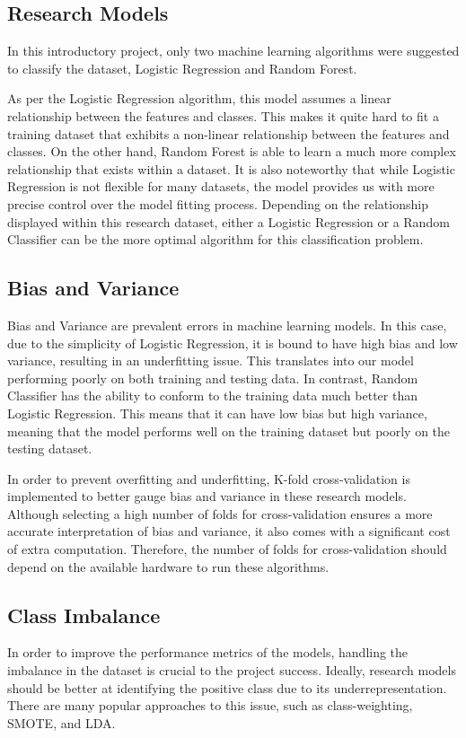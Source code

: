 \documentclass[12pt, letterpaper]{article}
\begin{document}
    \subsection{Research Models}
        In this introductory project, only two machine learning algorithms were suggested to classify the dataset, Logistic Regression and Random Forest.

        As per the Logistic Regression algorithm, this model assumes a linear relationship between the features and classes. This makes it quite hard to fit a training dataset that exhibits a non-linear relationship between the features and classes. On the other hand, Random Forest is able to learn a much more complex relationship that exists within a dataset. It is also noteworthy that while Logistic Regression is not flexible for many datasets, the model provides us with more precise control over the model fitting process. Depending on the relationship displayed within this research dataset, either a Logistic Regression or a Random Classifier can be the more optimal algorithm for this classification problem.
        
    \subsection{Bias and Variance}
        Bias and Variance are prevalent errors in machine learning models. In this case, due to the simplicity of Logistic Regression, it is bound to have high bias and low variance, resulting in an underfitting issue. This translates into our model performing poorly on both training and testing data. In contrast, Random Classifier has the ability to conform to the training data much better than Logistic Regression. This means that it can have low bias but high variance, meaning that the model performs well on the training dataset but poorly on the testing dataset.
        
        In order to prevent overfitting and underfitting, K-fold cross-validation is implemented to better gauge bias and variance in these research models. Although selecting a high number of folds for cross-validation ensures a more accurate interpretation of bias and variance, it also comes with a significant cost of extra computation. Therefore, the number of folds for cross-validation should depend on the available hardware to run these algorithms.
        
    \subsection{Class Imbalance}
        In order to improve the performance metrics of the models, handling the imbalance in the dataset is crucial to the project success. Ideally, research models should be better at identifying the positive class due to its underrepresentation. There are many popular approaches to this issue, such as class-weighting, SMOTE, and LDA.
\end{document}
